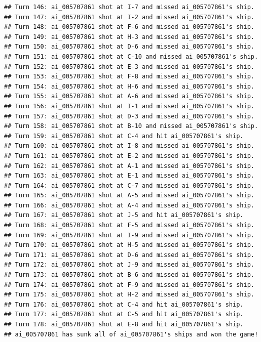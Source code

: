 \documentclass[
]{article}
\begin{document}
\begin{verbatim}
## Turn 146: ai_005707861 shot at I-7 and missed ai_005707861's ship.
## Turn 147: ai_005707861 shot at I-2 and missed ai_005707861's ship.
## Turn 148: ai_005707861 shot at F-6 and missed ai_005707861's ship.
## Turn 149: ai_005707861 shot at H-3 and missed ai_005707861's ship.
## Turn 150: ai_005707861 shot at D-6 and missed ai_005707861's ship.
## Turn 151: ai_005707861 shot at C-10 and missed ai_005707861's ship.
## Turn 152: ai_005707861 shot at E-3 and missed ai_005707861's ship.
## Turn 153: ai_005707861 shot at F-8 and missed ai_005707861's ship.
## Turn 154: ai_005707861 shot at H-6 and missed ai_005707861's ship.
## Turn 155: ai_005707861 shot at A-6 and missed ai_005707861's ship.
## Turn 156: ai_005707861 shot at I-1 and missed ai_005707861's ship.
## Turn 157: ai_005707861 shot at D-3 and missed ai_005707861's ship.
## Turn 158: ai_005707861 shot at B-10 and missed ai_005707861's ship.
## Turn 159: ai_005707861 shot at C-4 and hit ai_005707861's ship.
## Turn 160: ai_005707861 shot at I-8 and missed ai_005707861's ship.
## Turn 161: ai_005707861 shot at E-2 and missed ai_005707861's ship.
## Turn 162: ai_005707861 shot at A-1 and missed ai_005707861's ship.
## Turn 163: ai_005707861 shot at E-1 and missed ai_005707861's ship.
## Turn 164: ai_005707861 shot at C-7 and missed ai_005707861's ship.
## Turn 165: ai_005707861 shot at A-5 and missed ai_005707861's ship.
## Turn 166: ai_005707861 shot at A-4 and missed ai_005707861's ship.
## Turn 167: ai_005707861 shot at J-5 and hit ai_005707861's ship.
## Turn 168: ai_005707861 shot at F-5 and missed ai_005707861's ship.
## Turn 169: ai_005707861 shot at I-9 and missed ai_005707861's ship.
## Turn 170: ai_005707861 shot at H-5 and missed ai_005707861's ship.
## Turn 171: ai_005707861 shot at D-6 and missed ai_005707861's ship.
## Turn 172: ai_005707861 shot at J-9 and missed ai_005707861's ship.
## Turn 173: ai_005707861 shot at B-6 and missed ai_005707861's ship.
## Turn 174: ai_005707861 shot at F-9 and missed ai_005707861's ship.
## Turn 175: ai_005707861 shot at H-2 and missed ai_005707861's ship.
## Turn 176: ai_005707861 shot at C-4 and hit ai_005707861's ship.
## Turn 177: ai_005707861 shot at C-5 and hit ai_005707861's ship.
## Turn 178: ai_005707861 shot at E-8 and hit ai_005707861's ship.
## ai_005707861 has sunk all of ai_005707861's ships and won the game!
\end{verbatim}
\end{document}
